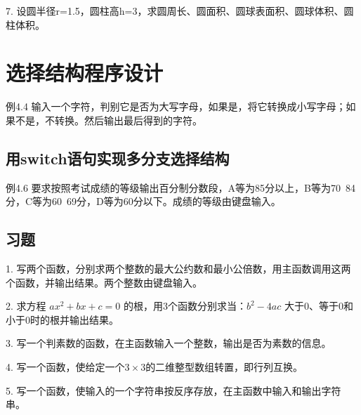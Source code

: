 7. 设圆半径r=1.5，圆柱高h=3，求圆周长、圆面积、圆球表面积、圆球体积、圆柱体积。

\chapter{选择结构程序设计}

例4.4 输入一个字符，判别它是否为大写字母，如果是，将它转换成小写字母；如果不是，不转换。然后输出最后得到的字符。

\section{用switch语句实现多分支选择结构}

例4.6 要求按照考试成绩的等级输出百分制分数段，A等为85分以上，B等为70~84分，C等为60~69分，D等为60分以下。成绩的等级由键盘输入。


\section{习题}

1. 写两个函数，分别求两个整数的最大公约数和最小公倍数，用主函数调用这两个函数，并输出结果。两个整数由键盘输入。

2. 求方程 $ax^2 + bx + c = 0$ 的根，用3个函数分别求当：$b^2 - 4ac$ 大于0、等于0和小于0时的根并输出结果。

3. 写一个判素数的函数，在主函数输入一个整数，输出是否为素数的信息。

4. 写一个函数，使给定一个$3 \times 3$的二维整型数组转置，即行列互换。

5. 写一个函数，使输入的一个字符串按反序存放，在主函数中输入和输出字符串。
